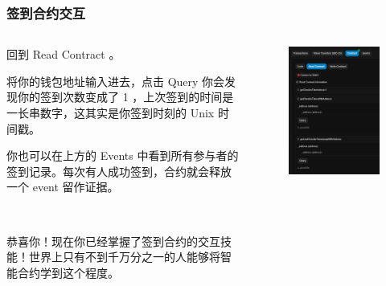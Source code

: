\documentclass{beamer}
\begin{document}
\begin{frame}
    \frametitle{签到合约交互}

    \begin{columns}
        \begin{column}{0.6\textwidth}
            回到 Read Contract 。

            将你的钱包地址输入进去，点击 Query 你会发现你的签到次数变成了 1 ，上次签到的时间是一长串数字，这其实是你签到时刻的 Unix 时间戳。

            你也可以在上方的 Events 中看到所有参与者的签到记录。每次有人成功签到，合约就会释放一个 event 留作证据。

            \

            恭喜你！现在你已经掌握了签到合约的交互技能！世界上只有不到千万分之一的人能够将智能合约学到这个程度。
        \end{column}

        \begin{column}{0.4\textwidth}
            \begin{figure}
                \centering
                \includegraphics[width=\textwidth]{s7.png}
            \end{figure}
        \end{column}
    \end{columns}

\end{frame}
\end{document}
